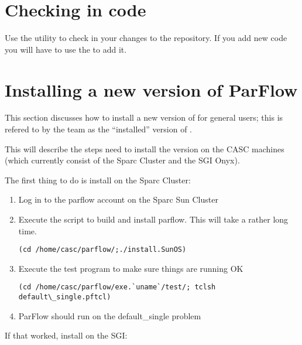 \section{Checking in code}
\label{Checking in code}

Use the  utility to check in your changes to the
\parflow{} repository.  If you add new code you will have to use
the  to add it.


\section{Installing a new version of ParFlow}
\label{Installing a new version of ParFlow}

This section discusses how to install a new version of \parflow 
for general users; this is refered to by the \parflow team as the
``installed'' version of \parflow.

This will describe the steps need to install the version on the CASC
machines (which currently consist of the Sparc Cluster and the SGI
Onyx).

The first thing to do is install on the Sparc Cluster:

\begin{enumerate}
\item
Log in to the parflow account on the Sparc Sun Cluster
\item
Execute the script to build and install parflow.  This will take 
a rather long time.
\begin{display}\begin{verbatim}
(cd /home/casc/parflow/;./install.SunOS)
\end{verbatim}\end{display}
\item
Execute the test program to make sure things are running OK
\begin{display}\begin{verbatim}
(cd /home/casc/parflow/exe.`uname`/test/; tclsh default\_single.pftcl)
\end{verbatim}\end{display}
\item
ParFlow should run on the default\_single problem
\end{enumerate}

If that worked, install on the SGI:

